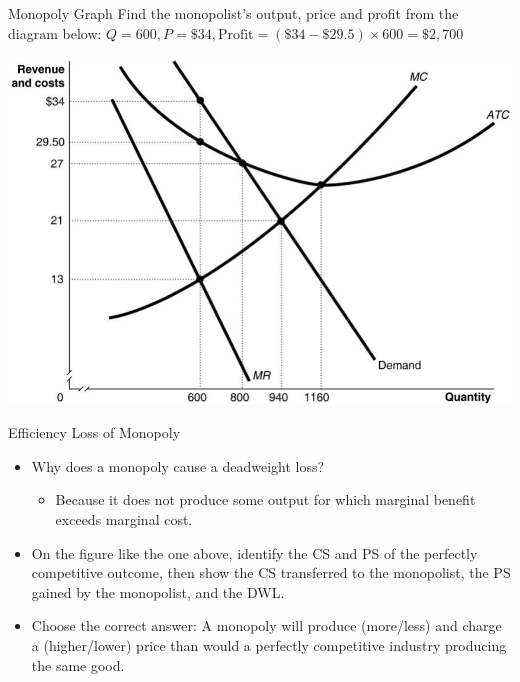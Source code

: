 \documentclass{beamer}
\begin{document}
\begin{frame}[t]{Monopoly Graph}
    Find the monopolist’s output, price and profit from the diagram below: $Q = 600, P = \$34, \text{Profit} = (\$34-\$29.5) \times 600 = \$2,700$
    \newline
    \begin{center}
        \includegraphics[scale = .6]{images/monopoly_graph.png}
    \end{center}
\end{frame}

\begin{frame}{Efficiency Loss of Monopoly}
    \begin{itemize}
        \item Why does a monopoly cause a deadweight loss?
        \begin{itemize}
            \item Because it does not produce some output for which marginal benefit exceeds marginal cost.
        \end{itemize}
        \item On the figure like the one above, identify the CS and PS of the perfectly competitive outcome, then show the CS transferred to the monopolist, the PS gained by the monopolist, and the DWL.
        \item Choose the correct answer: A monopoly will produce (more/less) and charge a (higher/lower) price than would a perfectly competitive industry producing the same good.
    \end{itemize}
\end{frame}
\end{document}
